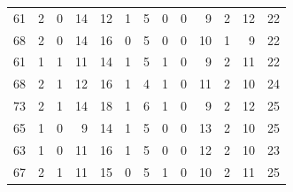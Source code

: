 \begin{table}[]
\begin{tabular}{rrrrrrrrrrrrr}
	61 & 2 & 0 & 14 & 12 & 1 & 5 & 0 & 0 & 9 & 2 & 12 & 22 \\
	68 & 2 & 0 & 14 & 16 & 0 & 5 & 0 & 0 & 10 & 1 & 9 & 22 \\
	61 & 1 & 1 & 11 & 14 & 1 & 5 & 1 & 0 & 9 & 2 & 11 & 22 \\
	68 & 2 & 1 & 12 & 16 & 1 & 4 & 1 & 0 & 11 & 2 & 10 & 24 \\
	73 & 2 & 1 & 14 & 18 & 1 & 6 & 1 & 0 & 9 & 2 & 12 & 25 \\
	65 & 1 & 0 & 9 & 14 & 1 & 5 & 0 & 0 & 13 & 2 & 10 & 25 \\
	63 & 1 & 0 & 11 & 16 & 1 & 5 & 0 & 0 & 12 & 2 & 10 & 23 \\
	67 & 2 & 1 & 11 & 15 & 0 & 5 & 1 & 0 & 10 & 2 & 11 & 25
	\end{tabular}
\end{table}

